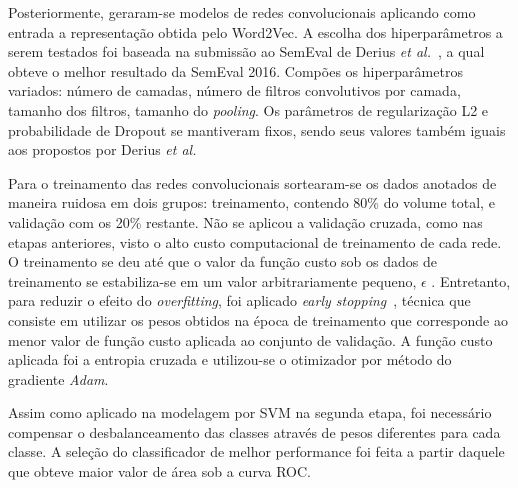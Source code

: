 Posteriormente, geraram-se modelos de redes convolucionais aplicando como entrada a representação obtida pelo Word2Vec.
A escolha dos hiperparâmetros a serem testados foi baseada na submissão ao SemEval de Derius
\textit{et al.}~\cite{deriu16}, a qual obteve o melhor resultado da SemEval 2016.
Compões os hiperparâmetros variados: número de camadas, número de filtros convolutivos por camada, tamanho dos filtros,
tamanho do \textit{pooling}.
Os parâmetros de regularização L2 e probabilidade de Dropout se mantiveram fixos, sendo seus valores também iguais aos
propostos por Derius \textit{et al.}

Para o treinamento das redes convolucionais sortearam-se os dados anotados de maneira ruidosa em dois grupos:
treinamento, contendo 80\% do volume total, e validação com os 20\% restante.
Não se aplicou a validação cruzada, como nas etapas anteriores, visto o alto custo computacional de treinamento de cada
rede.
O treinamento se deu até que o valor da função custo sob os dados de treinamento se estabiliza-se em um valor
arbitrariamente pequeno, $\epsilon$ .
Entretanto, para reduzir o efeito do \textit{overfitting}, foi aplicado \textit{early stopping}~\cite{caruana01},
técnica que consiste em utilizar os pesos obtidos na época de treinamento que corresponde ao menor valor de função custo
aplicada ao conjunto de validação.
A função custo aplicada foi a entropia cruzada e utilizou-se o otimizador por método do gradiente \textit{Adam}.

Assim como aplicado na modelagem por SVM na segunda etapa, foi necessário compensar o desbalanceamento das classes
através de pesos diferentes para cada classe.
A seleção do classificador de melhor performance foi feita a partir daquele que obteve maior valor de área sob a curva
ROC.

